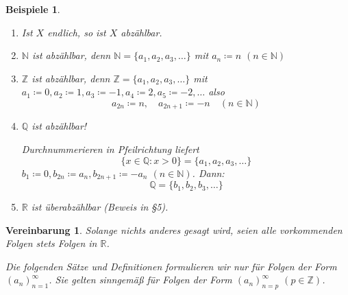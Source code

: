 \documentclass[titlepage,ngerman,a4paper,headsepline,DIV15,halfparskip*,14pt]{scrartcl}
\newcommand{\Z}{\mathbb{Z}}
\newcommand{\R}{\mathbb{R}}
\newcommand{\N}{\mathbb{N}}
\newcommand{\Q}{\mathbb{Q}}
\theoremstyle{dotless}
\newtheorem*{beispiele}{Beispiele}
\newtheorem*{vereinbarung}{Vereinbarung}
\begin{document}
\begin{beispiele} ~\
	\begin{enumerate}
		\item Ist $X$ endlich, so ist $X$ abzählbar.
		\item $\N$ ist abzählbar, denn $\N = \{ a_{1}, a_{2}, a_{3}, \dotsc \}$ mit $a_{n} \coloneqq n$ $(n \in \N)$
		\item $\Z$ ist abzählbar, denn $\Z = \{ a_{1}, a_{2}, a_{3}, \dotsc \}$ mit $a_{1} \coloneqq 0, a_{2} \coloneqq 1, a_{3} \coloneqq -1, a_{4} \coloneqq 2, a_{5} \coloneqq -2, \dotsc$ also
			$$ a_{2n} \coloneqq n, \quad a_{2n + 1} \coloneqq -n \quad (n \in \N) $$
		\item $\Q$ ist abzählbar!
			\begin{center}
			\end{center}
			Durchnummerieren in Pfeilrichtung liefert
				$$ \{ x \in \Q : x > 0 \} = \{ a_{1}, a_{2}, a_{3}, \dotsc \} $$
			$b_{1} \coloneqq 0, b_{2n} \coloneqq a_{n}, b_{2n + 1} \coloneqq - a_{n}$ $(n \in \N)$. Dann:
			$$ \Q = \{ b_{1}, b_{2}, b_{3}, \dotsc \} $$
		\item $\R$ ist überabzählbar (Beweis in \S 5).
	\end{enumerate}	
\end{beispiele}


\begin{vereinbarung}
	Solange nichts anderes gesagt wird, seien alle vorkommenden Folgen stets Folgen in $\R$. 
	                                                                                               
	Die folgenden Sätze und Definitionen formulieren wir nur für Folgen der Form $(a_{n})_{n=1}^{\infty}$. Sie gelten sinngemä{\ss} für Folgen der Form $(a_{n})_{n=p}^{\infty}$ $(p \in \Z)$.
\end{vereinbarung}
\end{document}
